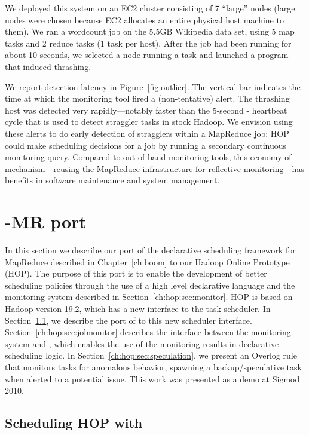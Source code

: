 We deployed this system on an EC2 cluster consisting of 7 ``large''
nodes (large nodes were chosen because EC2 allocates an entire
physical host machine to them). We ran a wordcount job on the 5.5GB Wikipedia
data set, using 5 map tasks and 2 reduce tasks (1 task per host). After
the job had been running for about 10 seconds, we selected a node
running a task and launched a program that induced thrashing.

We report detection latency in Figure~\ref{fig:outlier}. The vertical bar
indicates the time at which the monitoring tool fired a (non-tentative)
alert. The thrashing host was detected very rapidly---notably faster than the
5-second {\TT}-{\JT} heartbeat cycle that is used to detect straggler tasks in
stock Hadoop. We envision using these alerts to do early detection of stragglers
within a MapReduce job: HOP could make scheduling decisions for a job by running
a secondary continuous monitoring query. Compared to out-of-band monitoring
tools, this economy of mechanism---reusing the MapReduce infrastructure for
reflective monitoring---has benefits in software maintenance and system
management.

\section{\BOOM-MR port}
\label{ch:hop:sec:boom}

In this section we describe our port of the declarative scheduling framework
for MapReduce described in Chapter~\ref{ch:boom} to our Hadoop Online Prototype (HOP). The purpose
of this port is to enable the development of better scheduling policies through the use of a high level
declarative language and the monitoring system described in Section~\ref{ch:hop:sec:monitor}. HOP is
based on Hadoop version 19.2, which has a new interface to the task scheduler.
In Section~\ref{ch:hop:sec:jolport}, we describe the port of \JOL to this new scheduler interface. 
Section~\ref{ch:hop:sec:jolmonitor} describes the interface between the monitoring system and \JOL, 
which enables the use of the monitoring results in declarative scheduling logic. 
In Section~\ref{ch:hop:sec:speculation}, we present an Overlog rule that monitors tasks for anomalous behavior, spawning
a backup/speculative task when alerted to a potential issue. This work was presented as a demo at Sigmod 2010.

\subsection{Scheduling HOP with \JOL}
\label{ch:hop:sec:jolport}

